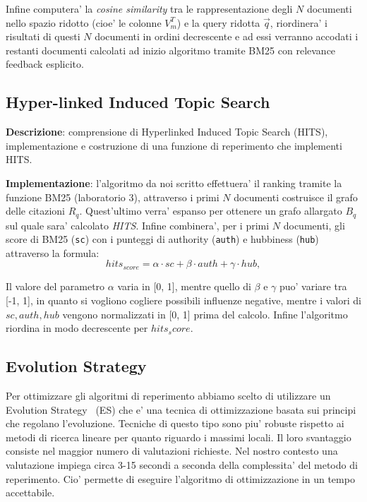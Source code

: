Infine computera' la \textit{cosine similarity} tra le rappresentazione degli $N$ documenti nello spazio ridotto (cioe' le colonne $V_m^{T}$) e la query ridotta $\vec{q}$, riordinera' i risultati di questi $N$ documenti in ordini decrescente e ad essi verranno accodati i restanti documenti calcolati ad inizio algoritmo tramite BM25 con relevance feedback esplicito.


\subsection{Hyper-linked Induced Topic Search}
\label{sec:hits}

\textbf{Descrizione}: comprensione di Hyperlinked Induced Topic Search (HITS), implementazione e costruzione di una funzione di reperimento che implementi HITS.

\textbf{Implementazione}: l'algoritmo da noi scritto effettuera' il ranking tramite la funzione BM25 (laboratorio 3), attraverso i primi $N$ documenti costruisce il grafo delle citazioni $R_q$. Quest'ultimo verra' espanso per ottenere un grafo allargato $B_q$ sul quale sara' calcolato \textit{HITS}.
Infine combinera', per i primi $N$ documenti, gli score di BM25 (\texttt{sc}) con i punteggi di authority (\texttt{auth}) e hubbiness (\texttt{hub}) attraverso la formula:
\[ hits_{score} =  \alpha \cdot sc + \beta \cdot auth + \gamma \cdot hub,\]

Il valore del parametro $\alpha$ varia in [0, 1],  mentre quello di $\beta$ e $\gamma$ puo' variare tra [-1, 1], in quanto si vogliono cogliere possibili influenze negative, mentre i valori di $sc, auth, hub$ vengono normalizzati in [0, 1] prima del calcolo. 
Infine l'algoritmo riordina in modo decrescente per $hits_score$.

\subsection{Evolution Strategy}
\label{sec:es}

Per ottimizzare gli algoritmi di reperimento abbiamo scelto di utilizzare un Evolution Strategy~\cite{back1996evolutionary} (ES) che e' una tecnica di ottimizzazione basata sui principi che regolano l'evoluzione. Tecniche di questo tipo sono piu' robuste rispetto ai metodi di ricerca lineare per quanto riguardo i massimi locali. Il loro svantaggio consiste nel maggior numero di valutazioni richieste. Nel nostro contesto una valutazione impiega circa 3-15 secondi a seconda della complessita' del metodo di reperimento. Cio' permette di eseguire l'algoritmo di ottimizzazione in un tempo accettabile.

